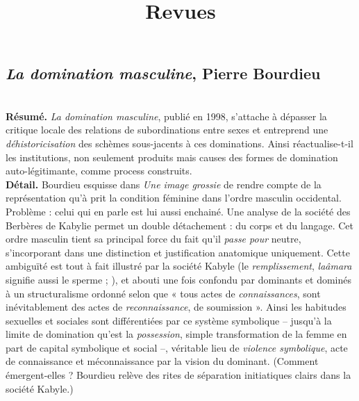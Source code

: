 \documentclass[11pt]{amsart}
\begin{document}
\title{Revues}
\maketitle
\tableofcontents

\subsection*{\textsl{La domination masculine}, Pierre Bourdieu}$ $\\

\textbf{Résumé.} \textsl{La domination masculine}, publié en 1998, s'attache à dépasser la critique locale des relations de subordinations entre sexes et entreprend une \textit{déhistoricisation} des schèmes sous-jacents à ces dominations. Ainsi réactualise-t-il les institutions, non seulement produits mais causes des formes de domination auto-légitimante, comme process construits.\\

\textbf{Détail.} Bourdieu esquisse dans \textsl{Une image grossie} de rendre compte de la représentation qu'à prit la condition féminine dans l'ordre masculin occidental. Problème : celui qui en parle est lui aussi enchainé. Une analyse de la société des Berbères de Kabylie permet un double détachement : du corps et du langage. Cet ordre masculin tient sa principal force du fait qu'il \textit{passe pour} neutre, s'incorporant dans une distinction et justification anatomique uniquement. Cette ambiguïté est tout à fait illustré par la société Kabyle (le \textit{remplissement}, \textit{laâmara} signifie aussi le sperme ; ), et abouti une fois confondu par dominants et dominés à un structuralisme ordonné selon que « tous actes de \textit{connaissances}, sont inévitablement des actes de \textit{reconnaissance}, de soumission ». Ainsi les habitudes sexuelles et sociales sont différentiées par ce système symbolique – jusqu'à la limite de domination qu'est la \textit{possession}, simple transformation de la femme en part de capital symbolique et social –, véritable lieu de \textit{violence symbolique}, acte de connaissance et méconnaissance par la vision du dominant. (Comment émergent-elles ? Bourdieu relève des rites de séparation initiatiques clairs dans la société Kabyle.) 
\end{document}
